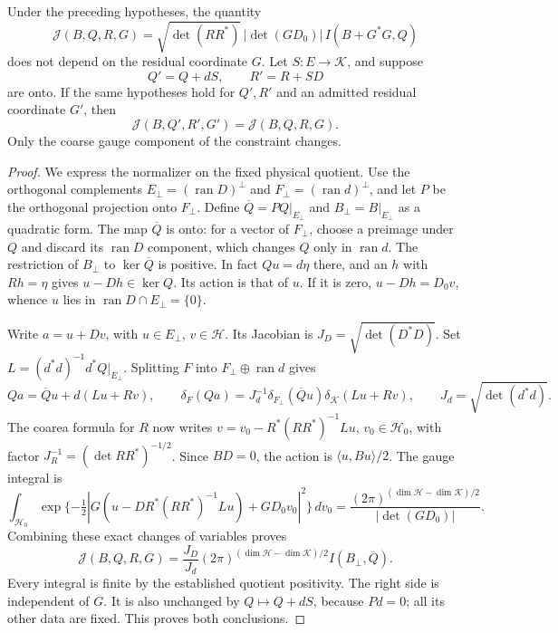 \documentclass[11pt,letterpaper,reqno]{amsart}
\makeatletter
\numberwithin{equation}{section}
\theoremstyle{definition}
\newcommand{\ms@majorstart}{%
  \pushQED{\qed}\renewcommand{\qedsymbol}{$\blacksquare\square$}}
\newenvironment{theorem}[1][]{\ms@majorstart\ms@theorem[#1]}
  {\popQED\endms@theorem}
\theoremstyle{remark}
\makeatother
\begin{document}
\begin{theorem}[Relative gauge normalization]
\label{gi:thm-relative-gauge}
Under the preceding hypotheses, the quantity
\begin{equation}\label{gi:eq-relative-gauge-normalizer}
 \mathcal J(B,Q,R,G)
   =\sqrt{\det(RR^*)}\,|\det(GD_0)|\,I(B+G^*G,Q)
\end{equation}
does not depend on the residual coordinate $G$.
Let $S:E\to\mathcal K$, and suppose
\[
                 Q'=Q+dS,\qquad R'=R+SD
\]
are onto. If the same hypotheses hold for $Q',R'$ and an
admitted residual coordinate $G'$, then
\[
             \mathcal J(B,Q',R',G')=\mathcal J(B,Q,R,G).
\]
Only the coarse gauge component of the constraint changes.
\end{theorem}

\begin{proof}
We express the normalizer on the fixed physical quotient.
Use the orthogonal complements
$E_\perp=(\operatorname{ran}D)^\perp$ and
$F_\perp=(\operatorname{ran}d)^\perp$, and let $P$ be
the orthogonal projection onto $F_\perp$. Define
$\overline Q=PQ|_{E_\perp}$ and
$B_\perp=B|_{E_\perp}$ as a quadratic form. The map
$\overline Q$ is onto: for a vector of $F_\perp$, choose
a preimage under $Q$ and discard its $\operatorname{ran}D$
component, which changes $Q$ only in $\operatorname{ran}d$.
The restriction of $B_\perp$ to $\ker\overline Q$ is
positive. In fact $Qu=d\eta$ there, and an $h$ with
$Rh=\eta$ gives $u-Dh\in\ker Q$. Its action is that
of $u$. If it is zero, $u-Dh=D_0v$, whence $u$ lies in
$\operatorname{ran}D\cap E_\perp=\{0\}$.

Write $a=u+Dv$, with $u\in E_\perp$, $v\in\mathcal H$.
Its Jacobian is $J_D=\sqrt{\det(D^*D)}$. Set
$L=(d^*d)^{-1}d^*Q|_{E_\perp}$. Splitting $F$ into
$F_\perp\oplus\operatorname{ran}d$ gives
\[
 Qa=\overline Qu+d(Lu+Rv),\qquad
 \delta_F(Qa)=J_d^{-1}\delta_{F_\perp}(\overline Qu)
                                  \delta_{\mathcal K}(Lu+Rv),
 \qquad J_d=\sqrt{\det(d^*d)}.
\]
The coarea formula for $R$ now writes
$v=v_0-R^*(RR^*)^{-1}Lu$, $v_0\in\mathcal H_0$, with
factor $J_R^{-1}=(\det RR^*)^{-1/2}$. Since $BD=0$,
the action is $\langle u,Bu\rangle/2$. The gauge integral is
\[
 \int_{\mathcal H_0}
   \exp\{-\tfrac12|G(u-DR^*(RR^*)^{-1}Lu)+GD_0v_0|^2\}\,dv_0
       =\frac{(2\pi)^{(\dim\mathcal H-\dim\mathcal K)/2}}
                    {|\det(GD_0)|}.
\]
Combining these exact changes of variables proves
\begin{equation}\label{gi:eq-quotient-normalizer}
 \mathcal J(B,Q,R,G)=
 \frac{J_D}{J_d}(2\pi)^{(\dim\mathcal H-\dim\mathcal K)/2}
       I(B_\perp,\overline Q).
\end{equation}
Every integral is finite by the established quotient positivity.
The right side is independent of $G$. It is also unchanged by
$Q\mapsto Q+dS$, because $P d=0$; all its other data are fixed.
This proves both conclusions.
\end{proof}
\end{document}
